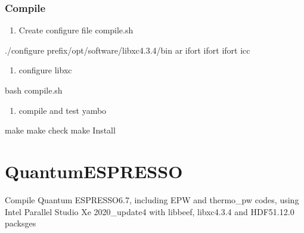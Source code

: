 \documentclass[a4paper,12pt,english]{sphinxmanual}
\begin{document}
\subsubsection{Compile}
\label{\detokenize{compile/hdf5_1.12.0:compile}}\begin{enumerate}
%
\item {} 
\sphinxAtStartPar
Create configure file compile.sh

\end{enumerate}

\begin{sphinxVerbatim}[commandchars=\\\{\}]
./configure \PYGZhy{}\PYGZhy{}prefix/opt/software/libxc\PYGZhy{}4.3.4/bin 
    ar 
    ifort 
    ifort 
    ifort 
    icc
\end{sphinxVerbatim}
\begin{enumerate}
%
\setcounter{enumi}{1}
\item {} 
\sphinxAtStartPar
configure libxc

\end{enumerate}

\begin{sphinxVerbatim}[commandchars=\\\{\}]
bash compile.sh
\end{sphinxVerbatim}
\begin{enumerate}
%
\setcounter{enumi}{2}
\item {} 
\sphinxAtStartPar
compile and test yambo

\end{enumerate}

\begin{sphinxVerbatim}[commandchars=\\\{\}]
make  make check  make Install
\end{sphinxVerbatim}


\section{Quantum\sphinxhyphen{}ESPRESSO}
\label{\detokenize{compile:quantum-espresso}}
\sphinxAtStartPar
Compile Quantum ESPRESSO\sphinxhyphen{}6.7, including EPW and thermo\_pw codes, using Intel Parallel Studio Xe 2020\_update4 with libbeef, libxc\sphinxhyphen{}4.3.4 and HDF5\sphinxhyphen{}1.12.0 packsges
\end{document}
